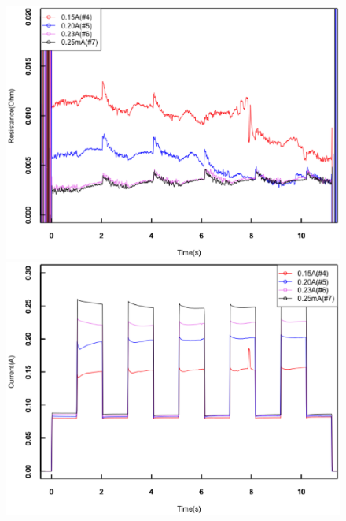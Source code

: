 \begin{figure}[!h]
 \begin{minipage}{\hsize}
    \begin{center}
   \includegraphics[width=0.9\hsize]{results_discussions/190113_Resistance_pulse.eps}
  \end{center}
  \caption{}
  \label{fig:190113_Resistance_pulse}
 \end{minipage}
 \begin{minipage}{\hsize}
     \begin{center}
   \includegraphics[width=0.9\hsize]{results_discussions/190113_Current_pulse.eps}
  \end{center}
  \caption{}
  \label{fig:190113_Current_pulse}
   \end{minipage}
\end{figure}

